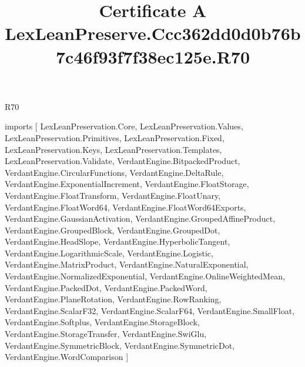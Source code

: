 \begin{lexlean}{R70}
\title{Certificate A LexLeanPreserve.Ccc362dd0d0b76b7c46f93f7f38ec125e.R70}
\begin{coremodule}
imports [
  LexLeanPreservation.Core,
  LexLeanPreservation.Values,
  LexLeanPreservation.Primitives,
  LexLeanPreservation.Fixed,
  LexLeanPreservation.Keys,
  LexLeanPreservation.Templates,
  LexLeanPreservation.Validate,
  VerdantEngine.BitpackedProduct,
  VerdantEngine.CircularFunctions,
  VerdantEngine.DeltaRule,
  VerdantEngine.ExponentialIncrement,
  VerdantEngine.FloatStorage,
  VerdantEngine.FloatTransform,
  VerdantEngine.FloatUnary,
  VerdantEngine.FloatWord64,
  VerdantEngine.FloatWord64Exports,
  VerdantEngine.GaussianActivation,
  VerdantEngine.GroupedAffineProduct,
  VerdantEngine.GroupedBlock,
  VerdantEngine.GroupedDot,
  VerdantEngine.HeadSlope,
  VerdantEngine.HyperbolicTangent,
  VerdantEngine.LogarithmicScale,
  VerdantEngine.Logistic,
  VerdantEngine.MatrixProduct,
  VerdantEngine.NaturalExponential,
  VerdantEngine.NormalizedExponential,
  VerdantEngine.OnlineWeightedMean,
  VerdantEngine.PackedDot,
  VerdantEngine.PackedWord,
  VerdantEngine.PlaneRotation,
  VerdantEngine.RowRanking,
  VerdantEngine.ScalarF32,
  VerdantEngine.ScalarF64,
  VerdantEngine.SmallFloat,
  VerdantEngine.Softplus,
  VerdantEngine.StorageBlock,
  VerdantEngine.StorageTransfer,
  VerdantEngine.SwiGlu,
  VerdantEngine.SymmetricBlock,
  VerdantEngine.SymmetricDot,
  VerdantEngine.WordComparison
]


\end{coremodule}
\end{lexlean}
